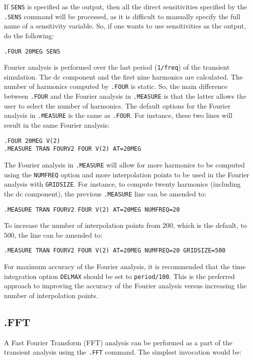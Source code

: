 {{If \texttt{SENS} is specified as the output, then all the direct sensitivities 
specified by the \texttt{.SENS} command will be processed, as it is difficult to 
manually specify the full name of a sensitivity variable.  So, if one wants 
to use sensitivities as the output, do the following:
\begin{verbatim}
.FOUR 20MEG SENS
\end{verbatim}

Fourier analysis is performed over the last period (\texttt{1/freq}) of 
the transient simulation.  The dc component and the first nine harmonics are calculated.
The number of harmonics computed by \texttt{.FOUR} is static.  So, the
main difference between \texttt{.FOUR} and the Fourier analysis in \texttt{.MEASURE} is that the latter allows the user to select the number of harmonics.  
The default options for the Fourier analysis in \texttt{.MEASURE} 
is the same as \texttt{.FOUR}.  For instance, these two lines will result in the 
same Fourier analysis:

\begin{verbatim}
.FOUR 20MEG V(2)
.MEASURE TRAN FOURV2 FOUR V(2) AT=20MEG
\end{verbatim}


The Fourier analysis in \texttt{.MEASURE} will allow for more harmonics
to be computed using the \texttt{NUMFREQ} option and more interpolation points
to be used in the Fourier analysis with \texttt{GRIDSIZE}.  
For instance, to compute twenty harmonics
(including the dc component), the previous \texttt{.MEASURE} line can be amended to:

\begin{verbatim}
.MEASURE TRAN FOURV2 FOUR V(2) AT=20MEG NUMFREQ=20
\end{verbatim}

To increase the number of interpolation points from $200$, which is the default,
to $500$, the line can be amended to:

\begin{verbatim}
.MEASURE TRAN FOURV2 FOUR V(2) AT=20MEG NUMFREQ=20 GRIDSIZE=500
\end{verbatim}

For maximum accuracy of the Fourier analysis, it is recommended that 
the time integration option \texttt{DELMAX}
should be set to \texttt{period/100}.  This is the preferred approach to
improving the accuracy of the Fourier analysis versus increasing the number of
interpolation points.

\subsection{.FFT}
A Fast Fourier Transform (FFT) analysis can be performed as a part of the
transient analysis using the \texttt{.FFT} command.  The simplest
invocation would be:

}}
